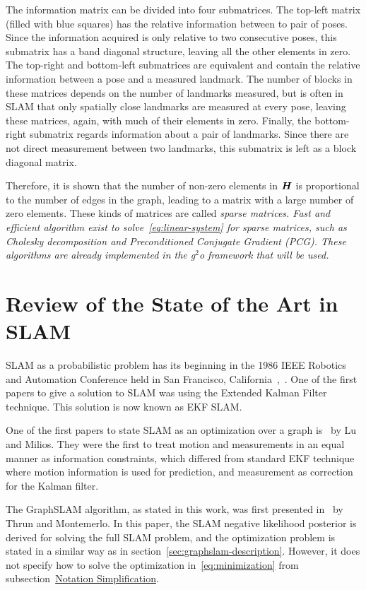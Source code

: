 The information matrix can be divided into four submatrices. The top-left matrix (filled with blue squares) has the relative information between to pair of poses. Since the information acquired is only relative to two consecutive poses, this submatrix has a band diagonal structure, leaving all the other elements in zero. The top-right and bottom-left submatrices are equivalent and contain the relative information between a pose and a measured landmark. The number of blocks in these matrices depends on the number of landmarks measured, but is often in SLAM that only spatially close landmarks are measured at every pose, leaving these matrices, again, with much of their elements in zero. Finally, the bottom-right submatrix regards information about a pair of landmarks. Since there are not direct measurement between two landmarks, this submatrix is left as a block diagonal matrix.

Therefore, it is shown that the number of non-zero elements in $\boldsymbol{H}$ is proportional to the number of edges in the graph, leading to a matrix with a large number of zero elements. These kinds of matrices are called \it{sparse matrices}. Fast and efficient algorithm exist to solve~\eqref{eq:linear-system} for sparse matrices, such as Cholesky decomposition and Preconditioned Conjugate Gradient (PCG). These algorithms are already implemented in the g$^2$o framework that will be used.

\section{Review of the State of the Art in SLAM}
\label{sec:state-of-the-art}

SLAM as a probabilistic problem has its beginning in the 1986 IEEE Robotics and Automation Conference held in San Francisco, California~\cite{tutorial},~\cite{ekfslam}. One of the first papers to give a solution to SLAM was \cite{ekfslam} using the Extended Kalman Filter technique. This solution is now known as EKF SLAM.

One of the first papers to state SLAM as an optimization over a graph is~\cite{firstgraph} by Lu and Milios. They were the first to treat motion and measurements in an equal manner as information constraints, which differed from standard EKF technique where motion information is used for prediction, and measurement as correction for the Kalman filter.

The GraphSLAM algorithm, as stated in this work, was first presented in~\cite{graphslam} by Thrun and Montemerlo. In this paper, the SLAM negative likelihood posterior is derived for solving the full SLAM problem, and the optimization problem is stated in a similar way as in section~\ref{sec:graphslam-description}. However, it does not specify how to solve the optimization in~\eqref{eq:minimization} from subsection~\hyperref[sec:notation-simplification]{Notation Simplification}. 


